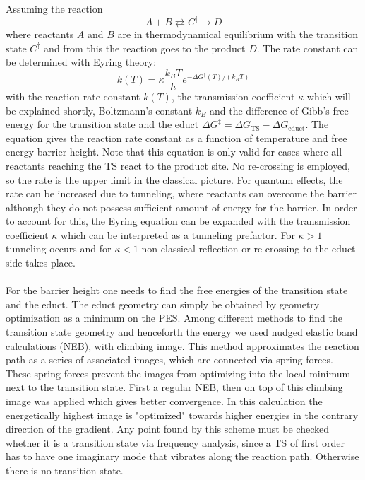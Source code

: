 \documentclass[11pt,DIV=13,BCOR=5mm,a4paper,headinclude]{scrbook}
\begin{document}
Assuming the reaction
\begin{equation}
A+ B \rightleftarrows C^\ddagger \rightarrow D
\end{equation}
where reactants $A$ and $B$ are in thermodynamical equilibrium with the transition state $C^\ddagger$ and from this the reaction goes to the product $D$.
The rate constant can be determined with Eyring theory\cite{eyring,eyring-polanyi}:
\begin{equation}\label{eq:eyring}
k(T)=\kappa\frac{k_BT}{h}e^{-\Delta G^\ddagger(T)/(k_BT)}
\end{equation}
with the reaction rate constant $k(T)$, the transmission coefficient $\kappa$ which will be explained shortly, Boltzmann's constant $k_B$ and the difference of Gibb's free energy for the transition state and the educt $\Delta G^\ddagger = \Delta G_\textrm{TS} - \Delta G_\textrm{educt}$.
The equation gives the reaction rate constant as a function of temperature and free energy barrier height.
Note that this equation is only valid for cases where all reactants reaching the TS react to the product site.
No re-crossing is employed, so the rate is the upper limit in the classical picture.
For quantum effects, the rate can be increased due to tunneling, where reactants can overcome the barrier although they do not possess sufficient amount of energy for the barrier.
In order to account for this, the Eyring equation can be expanded with the transmission coefficient $\kappa$ which can be interpreted as a tunneling prefactor.
For $\kappa>1$ tunneling occurs and for $\kappa<1$ non-classical reflection or re-crossing to the educt side takes place.
\\\\

For the barrier height one needs to find the free energies of the transition state and the educt.
The educt geometry can simply be obtained by geometry optimization as a minimum on the PES.
Among different methods to find the transition state geometry and henceforth the energy we used nudged elastic band calculations (NEB)\cite{Henkelman00a}, with climbing image\cite{Henkelman00b}.
This method approximates the reaction path as a series of associated images, which are connected via spring forces.
These spring forces prevent the images from optimizing into the local minimum next to the transition state.
First a regular NEB, then on top of this climbing image was applied which gives better convergence.
In this calculation the energetically highest image is "optimized" towards higher energies in the contrary direction of the gradient.
Any point found by this scheme must be checked whether it is a transition state via frequency analysis, since a TS of first order has to have one imaginary mode that vibrates along the reaction path.
Otherwise there is no transition state.
\end{document}
